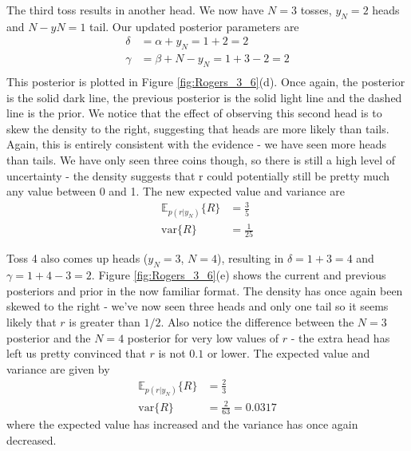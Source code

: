 The third toss results in another head. We now have $N = 3$ tosses, $y_N = 2$ heads
and $N - yN = 1$ tail. Our updated posterior parameters are
\begin{align*}
\delta & = \alpha + y_N    = 1 + 2 = 2 \\
\gamma & = \beta + N - y_N = 1 + 3 - 2 = 2 \\
\end{align*}
%
This posterior is plotted in Figure \ref{fig:Rogers_3_6}(d).
Once again, the posterior is the solid dark
line, the previous posterior is the solid light line and the dashed line is the prior.
We notice that the effect of observing this second head is to skew the density to
the right, suggesting that heads are more likely than tails. Again, this is entirely
consistent with the evidence - we have seen more heads than tails. We have only
seen three coins though, so there is still a high level of uncertainty - the density
suggests that r could potentially still be pretty much any value between 0 and 1.
The new expected value and variance are
\begin{align*}
\mathbb{E}_{p(r|y_N)} \{ R \} & = \frac{3}{5} \\
\mathrm{var}\{R\} & = \frac{1}{25}
\end{align*}

Toss 4 also comes up heads ($y_N = 3$, $N = 4$), resulting in $\delta = 1 + 3 = 4$
and $\gamma = 1 + 4 - 3 = 2$. Figure \ref{fig:Rogers_3_6}(e)
shows the current and previous posteriors and prior
in the now familiar format. The density has once again been skewed to the right -
we've now seen three heads and only one tail so it seems likely that $r$ is greater than
$1/2$. Also notice the difference between the $N = 3$ posterior and the $N = 4$ posterior
for very low values of $r$ - the extra head has left us pretty convinced that $r$
is not $0.1$ or lower. The expected value and variance are given by
\begin{align*}
\mathbb{E}_{p(r|y_N)} \{ R \} & = \frac{2}{3} \\
\mathrm{var}\{R\} & = \frac{2}{63} = 0.0317
\end{align*}
where the expected value has increased and the variance has once again decreased.

